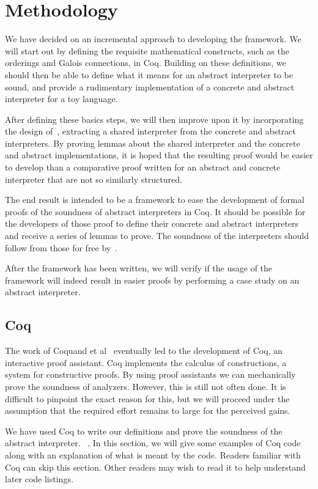 \section{Methodology}
We have decided on an incremental approach to developing the framework. We will
start out by defining the requisite mathematical constructs, such as the
orderings and Galois connections, in Coq. Building on these definitions, we
should then be able to define what it means for an abstract interpreter to be
sound, and provide a rudimentary implementation of a concrete and abstract
interpreter for a toy language.

After defining these basics steps, we will then improve upon it by incorporating
the design of~\cite{keidel2018compositional}, extracting a shared interpreter
from the concrete and abstract interpreters. By proving lemmas about the
shared interpreter and the concrete and abstract implementations, it is hoped
that the resulting proof would be easier to develop than a comparative proof
written for an abstract and concrete interpreter that are not so similarly
structured.

The end result is intended to be a framework to ease the development of formal
proofs of the soundness of abstract interpreters in Coq. It should be possible
for the developers of those proof to define their concrete and abstract
interpreters and receive a series of lemmas to prove. The soundness of the
interpreters should follow from those for free 
by~\cite{keidel2018compositional}.

After the framework has been written, we will verify if the usage of the
framework will indeed result in easier proofs by performing a case study on an
abstract interpreter.

\subsection{Coq}
The work of Coquand et al~\cite{coquand1986calculus} eventually led to the
development of Coq, an interactive proof assistant. Coq implements the calculus
of constructions, a system for constructive proofs. By using proof assistants 
we can mechanically prove the soundness of analyzers. 
However, this is still not often done. It is difficult to
pinpoint the exact reason for this, but we will proceed under the assumption
that the required effort remains to large for the perceived gains. 

We have used Coq to write our definitions and
prove the soundness of the abstract interpreter. ~\cite{coqintroduction}.
In this section, we will give some examples of Coq code along with an
explanation of what is meant by the code. Readers familiar with Coq can skip
this section. Other readers may wish to read it to help understand later code
listings.


